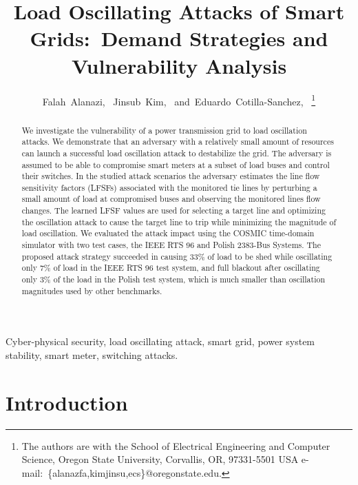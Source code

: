 \documentclass[journal]{IEEEtran}
\begin{document}
\title{Load Oscillating Attacks of Smart Grids:~Demand Strategies and Vulnerability Analysis }
\author{Falah~Alanazi,~
        Jinsub~Kim,~
        and~Eduardo~Cotilla-Sanchez,~%
\thanks{The authors are with the School of Electrical Engineering and Computer Science, Oregon State University, Corvallis,
OR, 97331-5501 USA e-mail:~\{alanazfa,kimjinsu,ecs\}@oregonstate.edu.}%
}
\maketitle

\begin{abstract} We investigate the vulnerability of a power transmission grid to load oscillation attacks. We demonstrate that an adversary with a relatively small amount of resources can launch a successful load oscillation attack to destabilize the grid. The adversary is assumed to be able to compromise smart meters at a subset of load buses and control their switches. In the studied attack scenarios the adversary estimates the line flow sensitivity factors (LFSFs) associated with the monitored tie lines by perturbing a small amount of load at compromised buses and observing the monitored lines flow changes. The learned LFSF values are used for selecting a target line and optimizing the oscillation attack to cause the target line to trip while minimizing the magnitude of load oscillation. We evaluated the attack impact using the COSMIC time-domain simulator with two test cases, the IEEE RTS 96 and Polish 2383-Bus Systems. The proposed attack strategy succeeded in causing 33\% of load to be shed while oscillating only 7\% of load in the IEEE RTS 96 test system, and full blackout after oscillating only 3\% of the load in the Polish test system, which is much smaller than oscillation magnitudes used by other benchmarks.

\end{abstract}

\begin{IEEEkeywords}
Cyber-physical security, load oscillating attack, smart grid, power system stability, smart meter, switching attacks.
\end{IEEEkeywords}

\section{Introduction}
\end{document}
